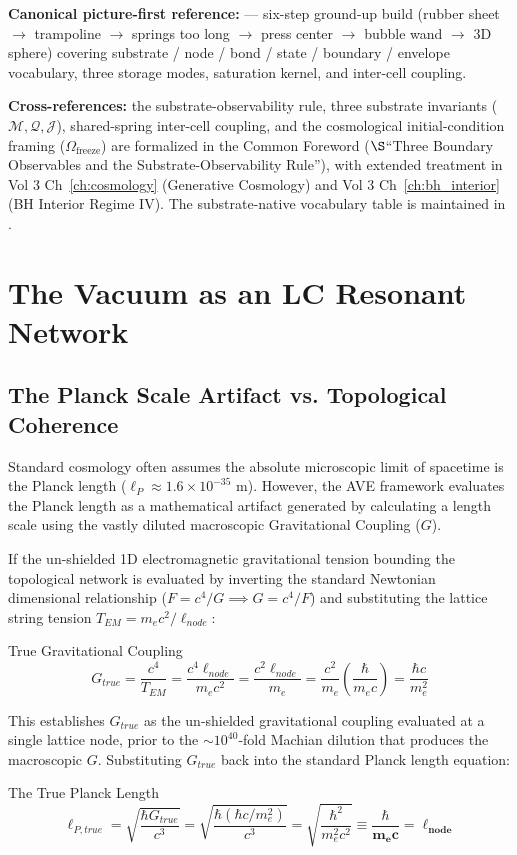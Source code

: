 \textbf{Canonical picture-first reference:}
 --- six-step
ground-up build (rubber sheet $\to$ trampoline $\to$ springs too long $\to$
press center $\to$ bubble wand $\to$ 3D sphere) covering substrate / node /
bond / state / boundary / envelope vocabulary, three storage modes,
saturation kernel, and inter-cell coupling.

\textbf{Cross-references:} the substrate-observability rule, three substrate
invariants ($\mathcal{M}, \mathcal{Q}, \mathcal{J}$), shared-spring inter-cell
coupling, and the cosmological initial-condition framing ($\Omega_{\text{freeze}}$)
are formalized in the Common Foreword ($\S$``Three Boundary Observables and
the Substrate-Observability Rule''), with extended treatment in Vol 3
Ch~\ref{ch:cosmology} (Generative Cosmology) and Vol 3
Ch~\ref{ch:bh_interior} (BH Interior Regime IV). The substrate-native
vocabulary table is maintained in .

\section{The Vacuum as an LC Resonant Network}

\subsection{The Planck Scale Artifact vs. Topological Coherence}
Standard cosmology often assumes the absolute microscopic limit of spacetime is the Planck length ($\ell_P \approx 1.6 \times 10^{-35}$ m). However, the AVE framework evaluates the Planck length as a mathematical artifact generated by calculating a length scale using the vastly diluted macroscopic Gravitational Coupling ($G$).

If the un-shielded 1D electromagnetic gravitational tension bounding the topological network is evaluated by inverting the standard Newtonian dimensional relationship ($F = c^4/G \implies G = c^4/F$) and substituting the lattice string tension $T_{EM} = m_e c^2 / \ell_{node}$:
\begin{resultbox}{True Gravitational Coupling}
\begin{equation}
    G_{true} = \frac{c^4}{T_{EM}} = \frac{c^4 \ell_{node}}{m_e c^2} = \frac{c^2 \ell_{node}}{m_e} = \frac{c^2}{m_e} \left(\frac{\hbar}{m_e c}\right) = \frac{\hbar c}{m_e^2}
\end{equation}
\end{resultbox}
This establishes $G_{true}$ as the un-shielded gravitational coupling evaluated at a single lattice node, prior to the $\sim 10^{40}$-fold Machian dilution that produces the macroscopic $G$. Substituting $G_{true}$ back into the standard Planck length equation:
\begin{resultbox}{The True Planck Length}
\begin{equation}
    \ell_{P, true} = \sqrt{\frac{\hbar G_{true}}{c^3}} = \sqrt{\frac{\hbar (\hbar c / m_e^2)}{c^3}} = \sqrt{\frac{\hbar^2}{m_e^2 c^2}} \equiv \mathbf{\frac{\hbar}{m_e c} = \ell_{node}}
\end{equation}
\end{resultbox}

